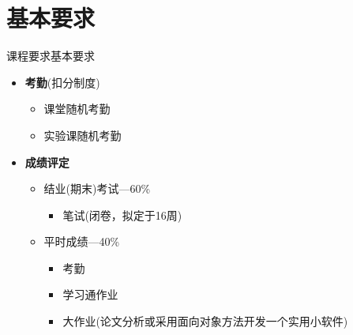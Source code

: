 \section[要求]{基本要求}\label{sec:chap00-sec03}
\begin{frame}{课程要求}{基本要求}
  \stretchon
  \begin{itemize}
  \item {\bfseries 考勤}(\alert{扣分制度})
    \begin{itemize}
    \item 课堂随机考勤
    \item 实验课随机考勤
    \end{itemize}
  \item  {\bfseries 成绩评定}
    \begin{itemize}
    \item 结业(期末)考试---\alert{60\%}
      \begin{itemize}
      \item 笔试(\alert{闭卷}，拟定于16周)
      \end{itemize}
    \item 平时成绩---\alert{40\%}
      \begin{itemize}
      \item 考勤      
      \item 学习通作业
      \item 大作业(论文分析或采用面向对象方法开发一个实用小软件)
      \end{itemize}
    \end{itemize}
  \end{itemize}
  \stretchoff
\end{frame}

